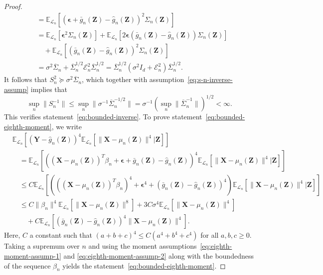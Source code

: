 \documentclass[ejs]{imsart}
\numberwithin{equation}{section}
\theoremstyle{plain}
\theoremstyle{definition}
\theoremstyle{remark}
\newcommand{\prx}{\bm X}
\newcommand{\prz}{\bm Z}
\newcommand{\pry}{{\bm Y}}
\newcommand{\peps}{\bm \epsilon}
\begin{document}
\begin{proof}
\begin{equation}
\begin{split}
		&=\mathbb E_{\mathcal L_n}[( \peps + \bar g_n(\prz)-\widehat g_n(\prz))^2 \Sigma_n(\prz)] \\
		& = \mathbb E_{\mathcal L_n}[\peps ^2 \Sigma_n(\prz)] + \mathbb E_{\mathcal L_n}[2\peps(\bar g_n(\prz)-\widehat g_n(\prz))\Sigma_n(\prz)]  \\
		&\quad + \mathbb E_{\mathcal L_n}[(\bar g_n(\prz)-\widehat g_n(\prz))^2\Sigma_n(\prz)] \\
		&= \sigma^2 \overline \Sigma_n + \overline \Sigma_n^{1/2}\mathcal E^2_n \overline \Sigma_n^{1/2}  = \overline \Sigma_n^{1/2}(\sigma^2 I_d + \mathcal E^2_n) \overline \Sigma_n^{1/2}.
		\label{eq:s-n-2-prime}
	\end{split}
\end{equation}
It follows that $S_n^2 \succcurlyeq \sigma^2 \overline \Sigma_n$, which together with assumption~\eqref{eq:s-n-inverse-assump} implies that
\begin{equation}
\sup_n \|S_n^{-1}\| \leq \sup_n \|\sigma^{-1}\overline \Sigma_n^{-1/2}\| = \sigma^{-1}\left(\sup_n \|\overline \Sigma_n^{-1}\|\right)^{1/2} < \infty.
\end{equation}
This verifies statement~\eqref{eq:bounded-inverse}.	To prove statement~\eqref{eq:bounded-eighth-moment}, we write
	\begin{equation*}
		\begin{split}
			&\mathbb E_{\mathcal L_n}\left[ (\pry - \widehat g_n(\prz))^{4}\mathbb E_{\mathcal L_n}[\|\prx - \mu_n(\prz)\|^{4}|\prz]\right] \\
			&\quad= \mathbb E_{\mathcal L_n}\left[ ((\prx - \mu_n(\prz))^T \beta_n + \peps + \bar g_n(\prz)-\widehat g_n(\prz))^4\mathbb E_{\mathcal L_n}[\|\prx - \mu_n(\prz)\|^{4}|\prz]\right] \\
			&\quad\leq C\mathbb E_{\mathcal L_n}\left[(((\prx - \mu_n(\prz))^T \beta_n)^4 + \peps^4 + (\bar g_n(\prz)-\widehat g_n(\prz))^4) \mathbb E_{\mathcal L_n}[\|\prx - \mu_n(\prz)\|^{4}|\prz]\right] \\
			&\quad\leq C\|\beta_n\|^4\mathbb E_{\mathcal L_n}[\|\prx - \mu_n(\prz)\|^{8}] + 3C\sigma^4\mathbb E_{\mathcal L_n}[\|\prx - \mu_n(\prz)\|^{4}] \\
			&\quad \quad + C \mathbb E_{\mathcal L_n}\left[(\bar g_n(\prz) - \widehat g_n(\prz))^{4} \|\prx - \mu_n(\prz)\|^{4}\right].
		\end{split}
	\end{equation*}
	Here, $C$ a constant such that $(a + b + c)^4 \leq C(a^4 + b^4 + c^4)$ for all $a,b,c \geq 0$. Taking a supremum over $n$ and using the moment assumptions~\eqref{eq:eighth-moment-assump-1} and \eqref{eq:eighth-moment-assump-2} along with the boundedness of the sequence $\beta_n$ yields the statement~\eqref{eq:bounded-eighth-moment}. 
	

\end{proof}
\end{document}
